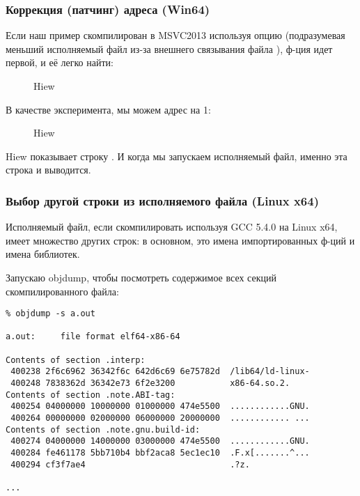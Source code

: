 \subsubsection{Коррекция (патчинг) адреса (Win64)}

Если наш пример скомпилирован в MSVC2013 используя опцию 
(подразумевая меньший исполняемый файл из-за внешнего связывания файла ),
ф-ция \main идет первой, и её легко найти:

\begin{figure}[H]
\centering
{}
\caption{Hiew}
\label{}
\end{figure}

В качестве эксперимента, мы можем  адрес на 1:

\begin{figure}[H]
\centering
{}
\caption{Hiew}
\label{}
\end{figure}

Hiew показывает строку .
И когда мы запускаем исполняемый файл, именно эта строка и выводится.

\subsubsection{Выбор другой строки из исполняемого файла (Linux x64)}

Исполняемый файл, если скомпилировать используя GCC 5.4.0 на Linux x64, имеет множество других строк:
в основном, это имена импортированных ф-ций и имена библиотек.

Запускаю objdump, чтобы посмотреть содержимое всех секций скомпилированного файла:

\begin{lstlisting}
% objdump -s a.out

a.out:     file format elf64-x86-64

Contents of section .interp:
 400238 2f6c6962 36342f6c 642d6c69 6e75782d  /lib64/ld-linux-
 400248 7838362d 36342e73 6f2e3200           x86-64.so.2.
Contents of section .note.ABI-tag:
 400254 04000000 10000000 01000000 474e5500  ............GNU.
 400264 00000000 02000000 06000000 20000000  ............ ...
Contents of section .note.gnu.build-id:
 400274 04000000 14000000 03000000 474e5500  ............GNU.
 400284 fe461178 5bb710b4 bbf2aca8 5ec1ec10  .F.x[.......^...
 400294 cf3f7ae4                             .?z.

...
\end{lstlisting}


